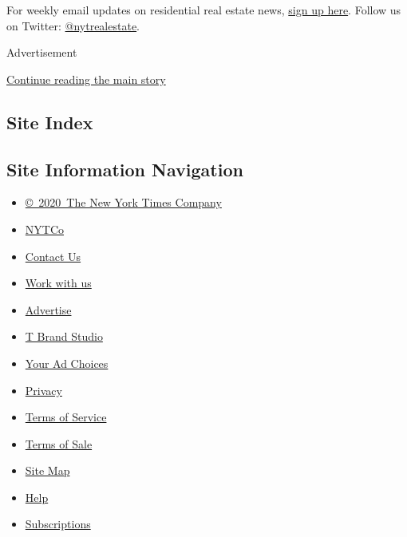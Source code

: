 For weekly email updates on residential real estate news,
\href{http://www.nytimes3xbfgragh.onion/newsletters/realestate/}{sign up
here}. Follow us on Twitter:
\href{https://twitter.com/nytrealestate}{@nytrealestate}.

Advertisement

\protect\hyperlink{after-bottom}{Continue reading the main story}

\hypertarget{site-index}{%
\subsection{Site Index}\label{site-index}}

\hypertarget{site-information-navigation}{%
\subsection{Site Information
Navigation}\label{site-information-navigation}}

\begin{itemize}
\tightlist
\item
  \href{https://help.nytimes3xbfgragh.onion/hc/en-us/articles/115014792127-Copyright-notice}{©~2020~The
  New York Times Company}
\end{itemize}

\begin{itemize}
\tightlist
\item
  \href{https://www.nytco.com/}{NYTCo}
\item
  \href{https://help.nytimes3xbfgragh.onion/hc/en-us/articles/115015385887-Contact-Us}{Contact
  Us}
\item
  \href{https://www.nytco.com/careers/}{Work with us}
\item
  \href{https://nytmediakit.com/}{Advertise}
\item
  \href{http://www.tbrandstudio.com/}{T Brand Studio}
\item
  \href{https://www.nytimes3xbfgragh.onion/privacy/cookie-policy\#how-do-i-manage-trackers}{Your
  Ad Choices}
\item
  \href{https://www.nytimes3xbfgragh.onion/privacy}{Privacy}
\item
  \href{https://help.nytimes3xbfgragh.onion/hc/en-us/articles/115014893428-Terms-of-service}{Terms
  of Service}
\item
  \href{https://help.nytimes3xbfgragh.onion/hc/en-us/articles/115014893968-Terms-of-sale}{Terms
  of Sale}
\item
  \href{https://spiderbites.nytimes3xbfgragh.onion}{Site Map}
\item
  \href{https://help.nytimes3xbfgragh.onion/hc/en-us}{Help}
\item
  \href{https://www.nytimes3xbfgragh.onion/subscription?campaignId=37WXW}{Subscriptions}
\end{itemize}
